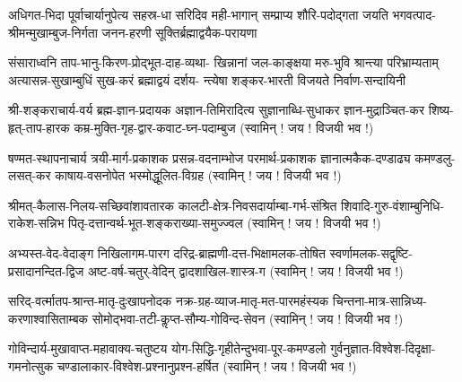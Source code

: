 



\fourlineindentedshloka
{अधिगत-भिदा पूर्वाचार्यानुपेत्य सहस्र-धा}
{सरिदिव मही-भागान् सम्प्राप्य शौरि-पदोद्गता}
{जयति भगवत्पाद-श्रीमन्मुखाम्बुज-निर्गता}
{जनन-हरणी सूक्तिर्ब्रह्माद्वयैक-परायणा}


\fourlineindentedshloka
{संसाराध्वनि ताप-भानु-किरण-प्रोद्भूत-दाह-व्यथा-}
{खिन्नानां जल-काङ्क्षया मरु-भुवि श्रान्त्या परिभ्राम्यताम्}
{अत्यासन्न-सुखाम्बुधिं सुख-करं ब्रह्माद्वयं दर्शय-}
{न्त्येषा शङ्कर-भारती विजयते निर्वाण-सन्दायिनी}



\newcommand{\jayavijayibhava}{\hfill (स्वामिन् ! जय ! विजयी भव !)}


\twolineshloka
{श्री-शङ्कराचार्य-वर्य ब्रह्म-ज्ञान-प्रदायक}
{अज्ञान-तिमिरादित्य सुज्ञानाब्धि-सुधाकर}
\twolineshloka
{ज्ञान-मुद्राञ्चित-कर शिष्य-हृत्-ताप-हारक}
{कम्र-मुक्ति-गृह-द्वार-कवाट-घ्न-पदाम्बुज}
\jayavijayibhava

\twolineshloka
{षण्मत-स्थापनाचार्य त्रयी-मार्ग-प्रकाशक}
{प्रसन्न-वदनाम्भोज परमार्थ-प्रकाशक}
\twolineshloka
{ज्ञानात्मकैक-दण्डाढ्य कमण्डलु-लसत्-कर}
{काषाय-वसनोपेत भस्मोद्धूलित-विग्रह}
\jayavijayibhava

\twolineshloka
{श्रीमत्-कैलास-निलय-सच्छिवांशावतारक}
{कालटी-क्षेत्र-निवसदार्याम्बा-गर्भ-संश्रित}
\twolineshloka
{शिवादि-गुरु-वंशाम्बुनिधि-राकेश-सन्निभ}
{पितृ-दत्तान्वर्थ-भूत-शङ्कराख्या-समुज्ज्वल}
\jayavijayibhava

\twolineshloka
{अभ्यस्त-वेद-वेदाङ्ग निखिलागम-पारग}
{दरिद्र-ब्राह्मणी-दत्त-भिक्षामलक-तोषित}
\twolineshloka
{स्वर्णामलक-सद्वृष्टि-प्रसादानन्दित-द्विज}
{अष्ट-वर्ष-चतुर्-वेदिन् द्वादशाखिल-शास्त्र-ग}
\jayavijayibhava

\twolineshloka
{सरिद्-वर्त्मातप-श्रान्त-मातृ-दुःखापनोदक}
{नक्र-ग्रह-व्याज-मातृ-मत-पारमहंस्यक}
\twolineshloka
{चिन्तना-मात्र-सान्निध्य-करणाश्वासिताम्बक}
{सोमोद्भवा-तटी-कॢप्त-सौम्य-गोविन्द-सेवन}
\jayavijayibhava

\twolineshloka
{गोविन्दार्य-मुखावाप्त-महावाक्य-चतुष्टय}
{योग-सिद्धि-गृहीतेन्दुभवा-पूर-कमण्डलो}
\twolineshloka
{गुर्वनुज्ञात-विश्वेश-दिदृक्षा-गमनोत्सुक}
{चण्डालाकार-विश्वेश-प्रश्नानुप्रश्न-हर्षित}
\jayavijayibhava

